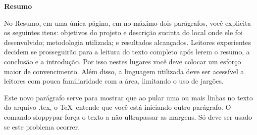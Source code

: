 
\begin{center}
\huge{{\bf Resumo}}
\vspace{2cm}
\end{center}

No Resumo, em uma única página, em no máximo dois parágrafos, você explicita os seguintes itens: objetivos do projeto e descrição sucinta do local onde ele foi desenvolvido; metodologia utilizada; e resultados alcançados. Leitores experientes decidem se prosseguirão para a leitura do texto completo após lerem o resumo, a conclusão e a introdução. Por isso nestes lugares você deve colocar um esforço maior de convencimento. Além disso, a linguagem utilizada deve ser acessível a leitores com pouca familiaridade com a área, limitando o uso de jargões.
 
\begin{sloppypar}
Este novo parágrafo serve para mostrar que ao pular uma ou mais linhas no texto do arquivo .tex, o \TeX\ entende que você está iniciando outro parágrafo. O comando sloppypar força o texto a não ultrapassar as margens. Só deve ser usado se este problema ocorrer.
\end{sloppypar}

 
\clearpage
\thispagestyle{empty}
\cleardoublepage

